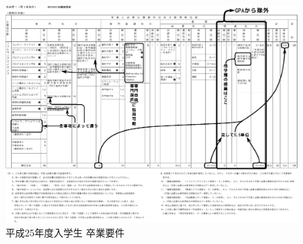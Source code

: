 \documentclass[a4j]{jsarticle}
\begin{document}
\newpage
\begin{figure}[H]
\begin{center}
\includegraphics[height=0.72\textheight,angle=90]{pic/rishuyoran/req.eps}
\caption{平成25年度入学生 卒業要件}
\end{center}
\end{figure}
\newpage
\end{document}
